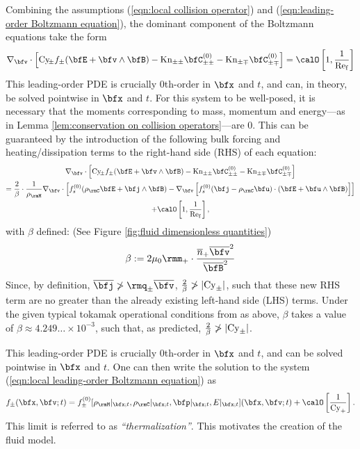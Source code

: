     Combining the assumptions (\ref{eqn:local collision operator}) and (\ref{eqn:leading-order Boltzmann equation}), the dominant component of the Boltzmann equations take the form
    \begin{equation}
        \nabla_{\bfv}\cdot\left[\rmCy\!_{\pm}f_{\pm}(\bfE + \bfv\wedge\bfB) - \rmKn_{\pm\pm}\bfC_{\pm\pm}^{(0)} - \rmKn_{\pm\mp}\bfC_{\pm\mp}^{(0)}\right]  =  \calO\left[1, \frac{1}{\rmRef}\right]
    \end{equation}
    This leading-order PDE is crucially 0th-order in $\bfx$ and $t$, and can, in theory, be solved pointwise in $\bfx$ and $t$. For this system to be well-posed, it is necessary that the moments corresponding to mass, momentum and energy---as in Lemma \ref{lem:conservation on collision operators}---are 0. This can be guaranteed by the introduction of the following bulk forcing and heating/dissipation terms to the right-hand side (RHS) of each equation:
    \begin{multline}\label{eqn:local leading-order Boltzmann equation}
        \nabla_{\bfv}\cdot\left[\rmCy\!_{\pm}f_{\pm}(\bfE + \bfv\wedge\bfB) - \rmKn_{\pm\pm}\bfC_{\pm\pm}^{(0)} - \rmKn_{\pm\mp}\bfC_{\pm\mp}^{(0)}\right]  \\
        =  \frac{2}{\beta}\cdot\frac{1}{\rho_{\rmM}}\nabla_{\bfv}\cdot\left[f_{s}^{(0)}(\rho_{\rmC}\bfE + \bfj\wedge\bfB) - \nabla_{\bfv}\left[f_{s}^{(0)}(\bfj - \rho_{\rmC}\bfu)\cdot\left(\bfE + \bfu\wedge\bfB\right)\right]\right]  \\
        + \calO\left[1, \frac{1}{\rmRef}\right],
    \end{multline}
    with $\beta$ defined: (See Figure \ref{fig:fluid dimensionless quantities})
    \begin{equation}
        \beta  :=  2\mu_{0}\rmm_{+}\cdot\frac{\overline{n}_{+}\overline{\bfv}^{2}}{\overline{\bfB}^{2}}
    \end{equation}
    Since, by definition, $\overline{\bfj}  \ngtr  \rmq_{\pm}\overline{\bfv}$, $\frac{2}{\beta}  \ngtr  |\mathrm{Cy}_{\pm}|$, such that these new RHS term are no greater than the already existing left-hand side (LHS) terms.  Under the given typical tokamak operational conditions from \cite{Wes00} as above, $\beta$ takes a value of $\beta  \approx 4.249\ldots\times 10^{- 3}$, such that, as predicted, $\frac{2}{\beta}  \ngtr  |\mathrm{Cy}_{\pm}|$.
    
    This leading-order PDE is crucially 0th-order in $\bfx$ and $t$, and can be solved pointwise in $\bfx$ and $t$. One can then write the solution to the system (\ref{eqn:local leading-order Boltzmann equation}) as
    \begin{equation}\label{eqn:thermalization}
        f_{\pm}(\bfx, \bfv; t)  =  f_{\pm}^{(0)}[\rho_{\rmM}|_{\bfx; t}, \rho_{\rmC}|_{\bfx; t}, \bfp|_{\bfx; t}, E|_{\bfx; t}](\bfx, \bfv; t) + \calO\left[\frac{1}{\rmCy_{+}}\right].
    \end{equation}
    This limit is referred to as \emph{``thermalization''}. This motivates the creation of the fluid model.

    
